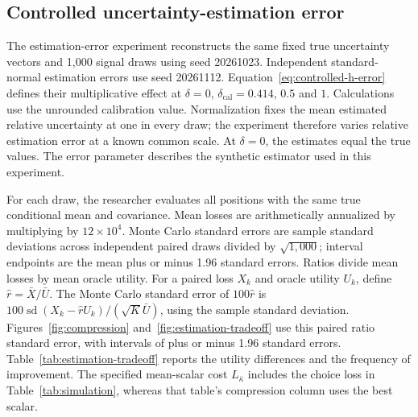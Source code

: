\subsection{Controlled uncertainty-estimation error}
The estimation-error experiment reconstructs the same fixed true uncertainty vectors and 1,000 signal draws using seed 20261023. Independent standard-normal estimation errors use seed 20261112. Equation~\eqref{eq:controlled-h-error} defines their multiplicative effect at $\delta=0$, $\delta_{\mathrm{cal}}=0.414$, $0.5$ and $1$. Calculations use the unrounded calibration value. Normalization fixes the mean estimated relative uncertainty at one in every draw; the experiment therefore varies relative estimation error at a known common scale. At $\delta=0$, the estimates equal the true values. The error parameter describes the synthetic estimator used in this experiment.

For each draw, the researcher evaluates all positions with the same true conditional mean and covariance. Mean losses are arithmetically annualized by multiplying by $12\times10^4$. Monte Carlo standard errors are sample standard deviations across independent paired draws divided by $\sqrt{1{,}000}$; interval endpoints are the mean plus or minus 1.96 standard errors. Ratios divide mean losses by mean oracle utility. For a paired loss $X_k$ and oracle utility $U_k$, define $\widehat r=\bar X/\bar U$. The Monte Carlo standard error of $100\widehat r$ is $100\operatorname{sd}(X_k-\widehat r U_k)/(\sqrt{K}\bar U)$, using the sample standard deviation. Figures~\ref{fig:compression} and~\ref{fig:estimation-tradeoff} use this paired ratio standard error, with intervals of plus or minus 1.96 standard errors. Table~\ref{tab:estimation-tradeoff} reports the utility differences and the frequency of improvement. The specified mean-scalar cost $L_{\bar\kappa}$ includes the choice loss in Table~\ref{tab:simulation}, whereas that table's compression column uses the best scalar.


